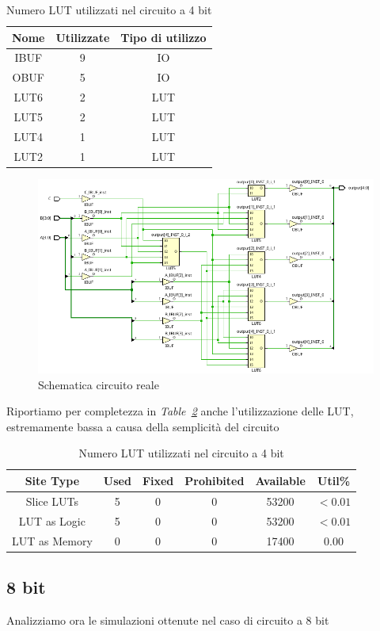 \begin{table}[ht]
      \centering
      \begin{tabular}{|c|c|c|}
        \hline
        Nome & Utilizzate & Tipo di utilizzo \\ \hline
        IBUF & 9 & IO \\ \hline
        OBUF & 5 & IO \\ \hline
        LUT6 & 2 & LUT \\ \hline
        LUT5 & 2 & LUT \\ \hline
        LUT4 & 1 & LUT \\ \hline
        LUT2 & 1 & LUT \\ \hline 
      \end{tabular}
      \caption{Numero LUT utilizzati nel circuito a 4 bit}
      \label{lut_quantity_4bit}
\end{table}
\begin{figure}[ht]
  \centering
  \includegraphics[width=1\textwidth]{assets/LUT/4bit/LUT_schematic_4bit.png}
  \caption{Schematica circuito reale}
  \label{lut_schematic_4bit} 
\end{figure}

Riportiamo per completezza in \textit{Table~\ref{lut_utilization_4bit}} anche l'utilizzazione delle LUT, estremamente bassa a causa della semplicità del circuito
\begin{table}[ht]
      \centering
      \begin{tabular}{|c|c|c|c|c|c|}
        \hline
        Site Type & Used & Fixed & Prohibited & Available & Util\% \\ \hline
        Slice LUTs & 5 & 0 & 0 & 53200 & $<0.01$ \\ \hline
         LUT as Logic & 5 & 0 & 0 & 53200 & $<0.01$ \\ \hline 
         LUT as Memory  & 0 & 0 & 0 & 17400 & $0.00$ \\ \hline
      \end{tabular}
      \caption{Numero LUT utilizzati nel circuito a 4 bit}
      \label{lut_utilization_4bit}
\end{table}
\FloatBarrier

\subsection{8 bit}
Analizziamo ora le simulazioni ottenute nel caso di circuito a 8 bit

